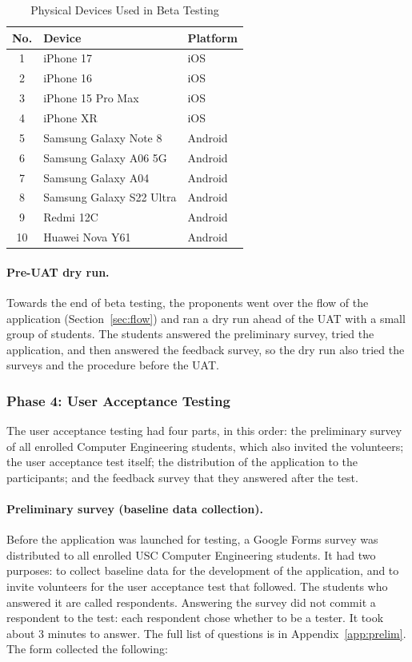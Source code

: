 \begin{table}[htbp]
    \centering
    \caption{Physical Devices Used in Beta Testing}
    \label{tab:betadevices}
    \small
    \renewcommand{\arraystretch}{1.2}
    \begin{tabular}{|c|l|l|}
        \hline
        \textbf{No.} & \textbf{Device} & \textbf{Platform} \\
        \hline
        1 & iPhone 17 & iOS \\
        2 & iPhone 16 & iOS \\
        3 & iPhone 15 Pro Max & iOS \\
        4 & iPhone XR & iOS \\
        5 & Samsung Galaxy Note 8 & Android \\
        6 & Samsung Galaxy A06 5G & Android \\
        7 & Samsung Galaxy A04 & Android \\
        8 & Samsung Galaxy S22 Ultra & Android \\
        9 & Redmi 12C & Android \\
        10 & Huawei Nova Y61 & Android \\
        \hline
    \end{tabular}
\end{table}

\paragraph{Pre-UAT dry run.} Towards the end of beta testing, the proponents went over the flow of the application (Section~\ref{sec:flow}) and ran a dry run ahead of the UAT with a small group of students. The students answered the preliminary survey, tried the application, and then answered the feedback survey, so the dry run also tried the surveys and the procedure before the UAT.

\subsubsection{Phase 4: User Acceptance Testing}
The user acceptance testing had four parts, in this order: the preliminary survey of all enrolled Computer Engineering students, which also invited the volunteers; the user acceptance test itself; the distribution of the application to the participants; and the feedback survey that they answered after the test.

\paragraph{Preliminary survey (baseline data collection).}\label{sec:prelim}
\indent Before the application was launched for testing, a Google Forms survey was distributed to all enrolled USC Computer Engineering students. It had two purposes: to collect baseline data for the development of the application, and to invite volunteers for the user acceptance test that followed. The students who answered it are called respondents. Answering the survey did not commit a respondent to the test: each respondent chose whether to be a tester. It took about 3 minutes to answer. The full list of questions is in Appendix~\ref{app:prelim}. The form collected the following:

